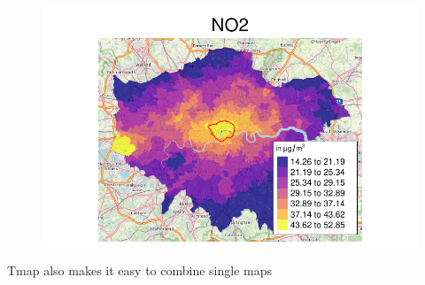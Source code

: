 \documentclass[
  letterpaper,
]{scrbook}
\begin{document}
\begin{figure}[H]

{\centering \includegraphics{02_spatial-data_files/figure-pdf/unnamed-chunk-19-1.pdf}

}

\end{figure}

Tmap also makes it easy to combine single maps
\end{document}
